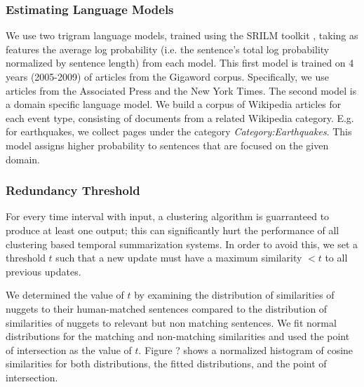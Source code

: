 \subsubsection{Estimating Language Models}
We use two trigram language models, trained using the SRILM toolkit \cite{stolcke2002srilm}, taking as features the average log probability (i.e. the sentence's total log probability normalized by sentence length) from each model.  This first model is trained on 4 years (2005-2009) of articles from the Gigaword corpus.  Specifically, we use articles from the Associated Press and the New York Times. The second model is a domain specific language model. We build a corpus of Wikipedia articles for each event type, consisting of documents from a related Wikipedia category. E.g. for earthquakes, we collect pages under the category \emph{Category:Earthquakes}. This model assigns higher probability to sentences that are focused on the given domain.



\subsubsection{Redundancy Threshold}

For every time interval with input, a clustering algorithm is
guarranteed to produce at least one output; 
this can significantly hurt the performance of all clustering based 
temporal summarization systems. In order to avoid this, we set a threshold $t$
such that a new update must have a maximum similarity $< t$ to all previous 
updates.

We determined the value of $t$ by examining the distribution of similarities
of nuggets to their human-matched sentences compared to the distribution
of similarities of nuggets to relevant but non matching sentences. We fit
normal distributions for the matching and non-matching similarities and
used the point of intersection as the value of $t$.
Figure ? shows a normalized histogram of cosine similarities for both 
distributions, the fitted distributions, and the point of intersection.


